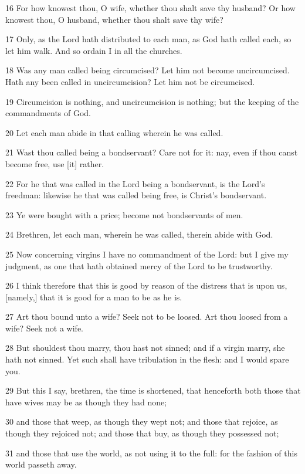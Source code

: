 \par 16 For how knowest thou, O wife, whether thou shalt save thy husband? Or how knowest thou, O husband, whether thou shalt save thy wife?
\par 17 Only, as the Lord hath distributed to each man, as God hath called each, so let him walk. And so ordain I in all the churches.
\par 18 Was any man called being circumcised? Let him not become uncircumcised. Hath any been called in uncircumcision? Let him not be circumcised.
\par 19 Circumcision is nothing, and uncircumcision is nothing; but the keeping of the commandments of God.
\par 20 Let each man abide in that calling wherein he was called.
\par 21 Wast thou called being a bondservant? Care not for it: nay, even if thou canst become free, use [it] rather.
\par 22 For he that was called in the Lord being a bondservant, is the Lord's freedman: likewise he that was called being free, is Christ's bondservant.
\par 23 Ye were bought with a price; become not bondservants of men.
\par 24 Brethren, let each man, wherein he was called, therein abide with God.
\par 25 Now concerning virgins I have no commandment of the Lord: but I give my judgment, as one that hath obtained mercy of the Lord to be trustworthy.
\par 26 I think therefore that this is good by reason of the distress that is upon us, [namely,] that it is good for a man to be as he is.
\par 27 Art thou bound unto a wife? Seek not to be loosed. Art thou loosed from a wife? Seek not a wife.
\par 28 But shouldest thou marry, thou hast not sinned; and if a virgin marry, she hath not sinned. Yet such shall have tribulation in the flesh: and I would spare you.
\par 29 But this I say, brethren, the time is shortened, that henceforth both those that have wives may be as though they had none;
\par 30 and those that weep, as though they wept not; and those that rejoice, as though they rejoiced not; and those that buy, as though they possessed not;
\par 31 and those that use the world, as not using it to the full: for the fashion of this world passeth away.
